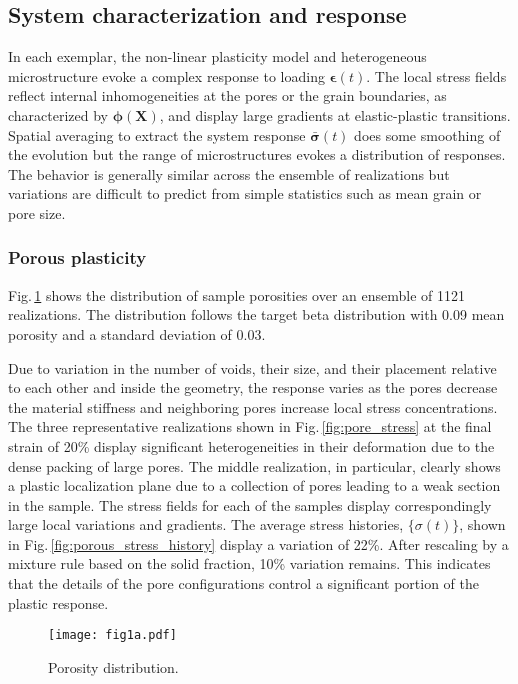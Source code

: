 \documentclass[12pt,reqno]{article}
\newcommand{\ADD}[1]{{#1}}
\newcommand{\fref}[1]{Fig.\,\ref{#1}}
\newcommand{\Xb}{\mathbf{X}}
\newcommand{\epsilonb}{{\boldsymbol{\epsilon}}}
\newcommand{\sigmab}{{\boldsymbol{\sigma}}}
\newcommand{\phib}{{\boldsymbol{\phi}}}
\begin{document}
\subsection{System characterization and response}\label{sec:response}

\ADD{
In each exemplar, the non-linear plasticity model and heterogeneous microstructure evoke a complex response to loading $\epsilonb(t)$.
The local stress fields reflect internal inhomogeneities at the pores or the grain boundaries, as characterized by $\phib(\Xb)$, and display large gradients at elastic-plastic transitions.
Spatial averaging to extract the system response $\bar{\sigmab}(t)$ does some smoothing of the evolution but the range of microstructures evokes a distribution of responses.
The behavior is generally similar across the ensemble of realizations but variations are difficult to predict from simple statistics such as mean grain or pore size.
}

\subsubsection{Porous plasticity} \label{sec:pp_response}

\ADD{
\fref{fig:porosity_distribution} shows the distribution of sample porosities over an ensemble of 1121 realizations.
The distribution follows the target beta distribution with 0.09 mean porosity and a standard deviation of 0.03.
}

\ADD{
Due to variation in the number of voids, their size, and their placement relative to each other and inside the geometry, the response varies as the pores decrease the material stiffness and neighboring pores increase local stress concentrations.
The three representative realizations shown in \fref{fig:pore_stress} at the final strain of 20\% display significant heterogeneities in their deformation due to the dense packing of large pores.
The middle realization, in particular, clearly shows a plastic localization plane  due to a collection of pores leading to a weak section in the sample.
The stress fields for each of the samples display correspondingly large local variations and gradients.
The average stress histories, $\{ \sigma(t) \}$, shown in \fref{fig:porous_stress_history} display a variation of 22\%.
After rescaling by a mixture rule based on the solid fraction, 10\% variation remains.
This indicates that the details of the pore configurations control a significant portion of the plastic response.
}

\begin{figure}
\centering
{\texttt{[image: fig1a.pdf]}}
\caption{\ADD{Porosity distribution.}
}
\label{fig:porosity_distribution}
\end{figure}
\end{document}
